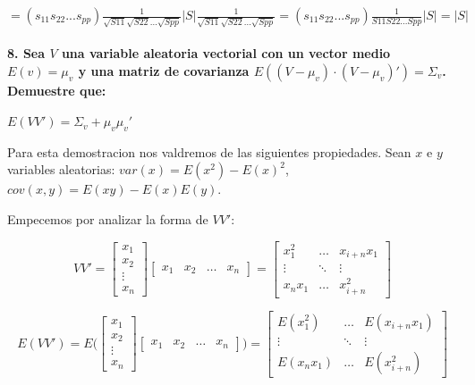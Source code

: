 \documentclass[
]{article}
\begin{document}
\(=(s_{11}s_{22}...s_{pp})\frac{1}{\sqrt{S11}\sqrt{S22}...\sqrt{Spp}}|S|\frac{1}{\sqrt{S11}\sqrt{S22}...\sqrt{Spp}} = (s_{11}s_{22}...s_{pp})\frac{1}{S11S22...Spp}|S|=|S|\)

\hypertarget{sea-v-una-variable-aleatoria-vectorial-con-un-vector-medio-ev-mu_v-y-una-matriz-de-covarianza-ev---mu_vcdot-v---mu_v-sigma_v.-demuestre-que}{%
\paragraph{\texorpdfstring{8. Sea \(V\) una variable aleatoria vectorial
con un vector medio \(E(v) = \mu_{v}\) y una matriz de covarianza
\(E((V - \mu_{v})\cdot (V - \mu_{v})') = \Sigma_{v}\). Demuestre
que:}{8. Sea V una variable aleatoria vectorial con un vector medio E(v) = \textbackslash mu\_\{v\} y una matriz de covarianza E((V - \textbackslash mu\_\{v\})\textbackslash cdot (V - \textbackslash mu\_\{v\})') = \textbackslash Sigma\_\{v\}. Demuestre que:}}\label{sea-v-una-variable-aleatoria-vectorial-con-un-vector-medio-ev-mu_v-y-una-matriz-de-covarianza-ev---mu_vcdot-v---mu_v-sigma_v.-demuestre-que}}

\(E(VV') = \Sigma_{v} + \mu_{v}\mu_{v}'\)

Para esta demostracion nos valdremos de las siguientes propiedades. Sean
\(x\) e \(y\) variables aleatorias: \(var(x) = E(x^2) - E(x)^2\),
\(cov(x, y) = E(xy) - E(x)E(y)\).

Empecemos por analizar la forma de \(VV'\):

\[
VV' = \begin{bmatrix}
            x_{1} \\ x_{2} \\ \vdots \\ x_{n}
      \end{bmatrix}
      \begin{bmatrix}
            x_{1} & x_{2} & \dots & x_{n}
      \end{bmatrix} = 
      \begin{bmatrix}
            x_{1}^{2} & \dots & x_{i + n}x_{1} \\
            \vdots    & \ddots & \vdots \\
            x_{n}x_{1} & \dots & x_{i + n}^{2}
      \end{bmatrix}
\]

\[
E(VV') = E\bigg(\begin{bmatrix}
            x_{1} \\ x_{2} \\ \vdots \\ x_{n}
      \end{bmatrix}
      \begin{bmatrix}
            x_{1} & x_{2} & \dots & x_{n}
      \end{bmatrix}\bigg) = 
      \begin{bmatrix}
            E(x_{1}^{2}) & \dots & E(x_{i + n}x_{1}) \\
            \vdots    & \ddots & \vdots \\
            E(x_{n}x_{1}) & \dots & E(x_{i + n}^{2})
      \end{bmatrix}
\]
\end{document}
